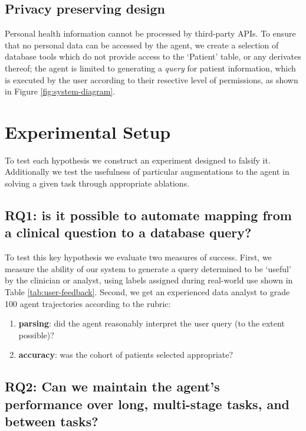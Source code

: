 \documentclass[11pt]{article}
\begin{document}
\subsection{Privacy preserving design}
Personal health information cannot be processed by third-party APIs.
To ensure that no personal data can be accessed by the agent, we create a selection of database tools which do not provide access to the `Patient' table, or any derivates thereof; the agent is limited to generating a \textit{query} for patient information, which is executed by the user according to their resective level of permissions, as shown in Figure \ref{fig:system-diagram}.


\section{Experimental Setup}
To test each hypothesis we construct an experiment designed to falsify it.
Additionally we test the usefulness of particular augmentations to the agent in solving a given task through appropriate ablations.

\subsection*{RQ1: is it possible to automate mapping from a clinical question to a database query?}

To test this key hypothesis we evaluate two measures of success.
First, we measure the ability of our system to generate a query determined to be `useful' by the clinician or analyst, using labels assigned during real-world use shown in Table \ref{tab:user-feedback}.
Second, we get an experienced data analyst to grade 100 agent trajectories according to the rubric:
\begin{enumerate}
	\item \textbf{parsing}: did the agent reasonably interpret the user query (to the extent possible)?
	\item \textbf{accuracy}: was the cohort of patients selected appropriate? 
\end{enumerate}


\subsection*{RQ2: Can we maintain the agent's performance over long, multi-stage tasks, and between tasks?}
\end{document}
